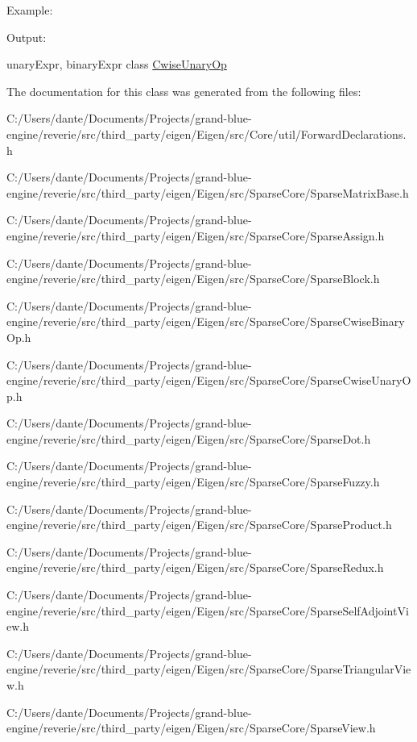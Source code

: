 Example\+: 
\begin{DoxyCodeInclude}{0}
\end{DoxyCodeInclude}
 Output\+: 
\begin{DoxyVerbInclude}
\end{DoxyVerbInclude}
 unary\+Expr, binary\+Expr class \mbox{\hyperlink{class_eigen_1_1_cwise_unary_op}{Cwise\+Unary\+Op}} 

The documentation for this class was generated from the following files\+:\begin{DoxyCompactItemize}
\item 
C\+:/\+Users/dante/\+Documents/\+Projects/grand-\/blue-\/engine/reverie/src/third\+\_\+party/eigen/\+Eigen/src/\+Core/util/Forward\+Declarations.\+h\item 
C\+:/\+Users/dante/\+Documents/\+Projects/grand-\/blue-\/engine/reverie/src/third\+\_\+party/eigen/\+Eigen/src/\+Sparse\+Core/Sparse\+Matrix\+Base.\+h\item 
C\+:/\+Users/dante/\+Documents/\+Projects/grand-\/blue-\/engine/reverie/src/third\+\_\+party/eigen/\+Eigen/src/\+Sparse\+Core/Sparse\+Assign.\+h\item 
C\+:/\+Users/dante/\+Documents/\+Projects/grand-\/blue-\/engine/reverie/src/third\+\_\+party/eigen/\+Eigen/src/\+Sparse\+Core/Sparse\+Block.\+h\item 
C\+:/\+Users/dante/\+Documents/\+Projects/grand-\/blue-\/engine/reverie/src/third\+\_\+party/eigen/\+Eigen/src/\+Sparse\+Core/Sparse\+Cwise\+Binary\+Op.\+h\item 
C\+:/\+Users/dante/\+Documents/\+Projects/grand-\/blue-\/engine/reverie/src/third\+\_\+party/eigen/\+Eigen/src/\+Sparse\+Core/Sparse\+Cwise\+Unary\+Op.\+h\item 
C\+:/\+Users/dante/\+Documents/\+Projects/grand-\/blue-\/engine/reverie/src/third\+\_\+party/eigen/\+Eigen/src/\+Sparse\+Core/Sparse\+Dot.\+h\item 
C\+:/\+Users/dante/\+Documents/\+Projects/grand-\/blue-\/engine/reverie/src/third\+\_\+party/eigen/\+Eigen/src/\+Sparse\+Core/Sparse\+Fuzzy.\+h\item 
C\+:/\+Users/dante/\+Documents/\+Projects/grand-\/blue-\/engine/reverie/src/third\+\_\+party/eigen/\+Eigen/src/\+Sparse\+Core/Sparse\+Product.\+h\item 
C\+:/\+Users/dante/\+Documents/\+Projects/grand-\/blue-\/engine/reverie/src/third\+\_\+party/eigen/\+Eigen/src/\+Sparse\+Core/Sparse\+Redux.\+h\item 
C\+:/\+Users/dante/\+Documents/\+Projects/grand-\/blue-\/engine/reverie/src/third\+\_\+party/eigen/\+Eigen/src/\+Sparse\+Core/Sparse\+Self\+Adjoint\+View.\+h\item 
C\+:/\+Users/dante/\+Documents/\+Projects/grand-\/blue-\/engine/reverie/src/third\+\_\+party/eigen/\+Eigen/src/\+Sparse\+Core/Sparse\+Triangular\+View.\+h\item 
C\+:/\+Users/dante/\+Documents/\+Projects/grand-\/blue-\/engine/reverie/src/third\+\_\+party/eigen/\+Eigen/src/\+Sparse\+Core/Sparse\+View.\+h\end{DoxyCompactItemize}
